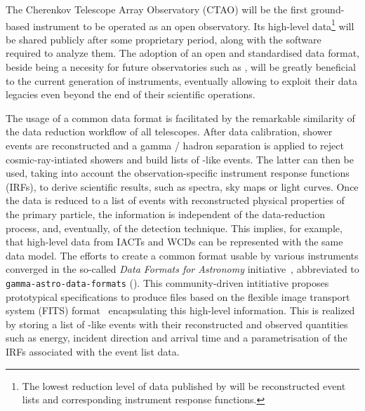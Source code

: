 \documentclass[longauth]{aa}
\begin{document}
The Cherenkov Telescope Array Observatory (CTAO) will be the first ground-based
\gammaray instrument to be operated as an open observatory.
Its high-level data\footnote{The lowest reduction level of data published by \cta will be reconstructed event lists and corresponding instrument response functions.}
will be shared publicly after some proprietary period, along with the software required to analyze them.
The adoption of an open and standardised \gammaray data format, beside being a necesity for future observatories such as \cta,
will be greatly beneficial to the current generation of instruments, eventually allowing to exploit their data legacies even
beyond the end of their scientific operations.

The usage of a common data format is facilitated by the remarkable similarity of the data reduction workflow of all \gammaray telescopes.
After data calibration, shower events are reconstructed and
a gamma / hadron separation is applied to reject cosmic-ray-intiated showers and build lists of \gammaray-like events.
The latter can then be used, taking into account the observation-specific instrument response functions (IRFs),
to derive scientific results, such as spectra, sky maps or light curves.
Once the data is reduced to a list of events with reconstructed physical properties of the primary particle,
the information is independent of the data-reduction process, and, eventually, of the detection technique. This implies,
for example, that high-level data from IACTs and WCDs can be represented
with the same data model.
The efforts to create a common format usable by various instruments
converged in the so-called \textit{Data Formats for \gammaray Astronomy}
initiative~\citep{gadf_proc,gadf_universe}, abbreviated to
\texttt{gamma-astro-data-formats} (\gadf). This community-driven intitiative proposes prototypical
specifications to produce files based on the flexible image transport system
(FITS) format~\citep{fits} encapsulating this high-level information. This is
realized by storing a list of \gammaray-like events with their reconstructed and observed
quantities such as energy, incident direction and arrival time and a parametrisation of
the IRFs associated with the event list data. %
\end{document}
